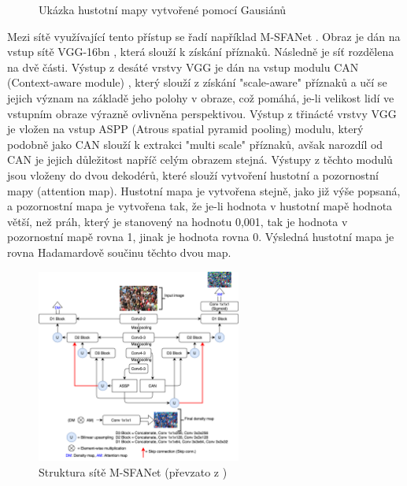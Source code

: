 \begin{figure}[h!]
	\centering
	\caption{Ukázka hustotní mapy vytvořené pomocí Gausiánů}
\end{figure}

Mezi sítě využívající tento přístup se řadí například M-SFANet \cite{MSFANet_for_crowd_counting}.
Obraz je dán na vstup sítě VGG-16bn \cite{VGG}, která slouží k získání příznaků.
Následně je síť rozdělena na dvě části.
Výstup z desáté vrstvy VGG je dán na vstup modulu CAN (Context-aware module) \cite{CAN_1, CAN_2}, který slouží z získání "scale-aware" příznaků a učí se jejich význam na základě jeho polohy v obraze, což pomáhá, je-li velikost lidí ve vstupním obraze výrazně ovlivněna perspektivou.
Výstup z třinácté vrstvy VGG je vložen na vstup ASPP \cite{ASPP} (Atrous spatial pyramid pooling) modulu, který podobně jako CAN slouží k extrakci "multi scale" příznaků, avšak narozdíl od CAN je jejich důležitost napříč celým obrazem stejná.
Výstupy z těchto modulů jsou vloženy do dvou dekodérů, které slouží vytvoření hustotní a pozornostní mapy (attention map).
Hustotní mapa je vytvořena stejně, jako již výše popsaná, a pozornostní mapa je vytvořena tak, že je-li hodnota v hustotní mapě hodnota větší, než práh, který je stanovený na hodnotu 0,001, tak je hodnota v pozornostní mapě rovna 1, jinak je hodnota rovna 0.
Výsledná hustotní mapa je rovna Hadamardově součinu těchto dvou map.

\begin{figure}[h!]
	\centering
	\includegraphics[width=0.6\textwidth]{Figures/history/MSFANet.png}
	\caption{Struktura sítě M-SFANet (převzato z \cite{MSFANet_for_crowd_counting})}
	\label{fig:M-SFANet}
\end{figure}







\endinput
